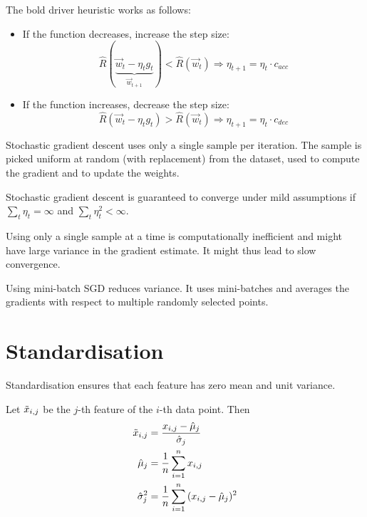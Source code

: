 The bold driver heuristic works as follows:
\begin{itemize}
	\item If the function decreases, increase the step size:
	\begin{equation*}
	\hat{R}(\underbrace{\vec{w}_t - \eta_t g_t}_{\vec{w}_{t+1}}) < \hat{R}(\vec{w}_t)
	\Rightarrow \eta_{t + 1} = \eta_t \cdot c_{acc}
	\end{equation*}
	\item If the function increases, decrease the step size:
	\begin{equation*}
	\hat{R}(\vec{w}_t - \eta_t g_t) > \hat{R}(\vec{w}_t)
	\Rightarrow \eta_{t + 1} = \eta_t \cdot c_{dec}
	\end{equation*}
\end{itemize}

Stochastic gradient descent uses only a single
sample per iteration.
The sample is picked uniform at random
(with replacement) from the dataset,
used to compute the gradient and to update the
weights.

Stochastic gradient descent is guaranteed to
converge under mild assumptions if
$\sum_t{\eta_t} = \infty$ and
$\sum_t{\eta_t^2} < \infty$.

Using only a single sample at a time is computationally inefficient
and might have large variance in the gradient estimate.
It might thus lead to slow convergence.

Using mini-batch SGD reduces variance.
It uses mini-batches and averages the gradients with respect to
multiple randomly selected points.


\section{Standardisation}
Standardisation ensures that each feature has
zero mean and unit variance.

Let $\Tilde{x}_{i,j}$ be the $j$-th feature of
the $i$-th data point. Then
\begin{align*}
\Tilde{x}_{i,j} &= \frac{x_{i,j} - \hat{\mu}_j}{\hat{\sigma}_j} \\
\hat{\mu}_j &= \frac{1}{n} \sum_{i=1}^n{x_{i,j}} \\
\hat{\sigma}_j^2 &= \frac{1}{n} \sum_{i=1}^n{(x_{i,j} - \hat{\mu}_j)^2}
\end{align*}

